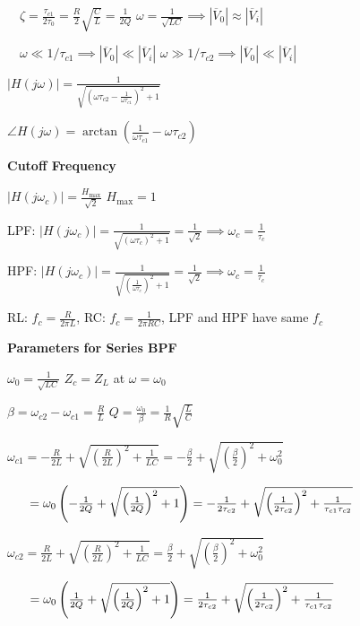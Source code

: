 \documentclass[twocolumn]{article}
\begin{document}
$\quad \zeta = \frac{\tau_{c1}}{2\tau_0} = \frac{R}{2} \sqrt{\frac{C}{L}} = \frac{1}{2Q}$ \hfill $\omega = \frac{1}{\sqrt{LC}} \implies |\overline{V}_0| \approx |\overline{V}_i |$

$\quad \omega \ll 1 / \tau_{c1} \implies |\overline{V}_0| \ll | \overline{V}_i |$ \hfill $\omega \gg 1 / \tau_{c2} \implies |\overline{V}_0| \ll | \overline{V}_i |$

$|H(j\omega)| = \frac{1}{\sqrt{\left( \omega \tau_{c2} - \frac{1}{\omega \tau_{c1}} \right)^2 + 1}}$

$\angle H(j\omega) = \arctan \left( \frac{1}{\omega \tau_{c1}} - \omega \tau_{c2} \right)$

\cleardoublepage


\textbf{Cutoff Frequency}

$|H(j\omega_c)| = \frac{H_{\text{max}}}{\sqrt{2}}$ \hfill $H_{\text{max}} = 1$

LPF: $|H(j \omega_c)| = \frac{1}{\sqrt{(\omega \tau_c)^2 + 1}} = \frac{1}{\sqrt{2}} \implies \omega_c = \frac{1}{\tau_c}$

HPF: $|H(j \omega_c)| = \frac{1}{\sqrt{\left( \frac{1}{\omega \tau_c} \right)^2 + 1}} = \frac{1}{\sqrt{2}} \implies \omega_c = \frac{1}{\tau_c}$

RL: $f_c = \frac{R}{2\pi L}$, \hfill RC: $f_c = \frac{1}{2\pi RC}$, \hfill LPF and HPF have same $f_c$

\dotfill

\textbf{Parameters for Series BPF}

$\omega_0 = \frac{1}{\sqrt{LC}}$ \hfill $Z_c = Z_L$ at $\omega = \omega_0$

$\beta = \omega_{c2} - \omega_{c1} = \frac{R}{L}$ \hfill $Q = \frac{\omega_0}{\beta} = \frac{1}{R} \sqrt{\frac{L}{C}}$


$\omega_{c1} = -\frac{R}{2L} + \sqrt{\left( \frac{R}{2L} \right)^2 + \frac{1}{LC}} = -\frac{\beta}{2} + \sqrt{\left(\frac{\beta}{2}\right)^2 + \omega_0^2}$

$\hspace{1.75em} = \omega_0 \left( -\frac{1}{2Q} + \sqrt{\left(\frac{1}{2Q}\right)^2 + 1} \right) = -\frac{1}{2\tau_{c2}} + \sqrt{\left(\frac{1}{2\tau_{c2}}\right)^2 + \frac{1}{\tau_{c1} \tau_{c2}}}$

$\omega_{c2} = \frac{R}{2L} + \sqrt{\left( \frac{R}{2L} \right)^2 + \frac{1}{LC}} = \frac{\beta}{2} + \sqrt{\left(\frac{\beta}{2}\right)^2 + \omega_0^2}$

$\hspace{1.75em} = \omega_0 \left( \frac{1}{2Q} + \sqrt{\left(\frac{1}{2Q}\right)^2 + 1} \right) = \frac{1}{2\tau_{c2}} + \sqrt{\left(\frac{1}{2\tau_{c2}}\right)^2 + \frac{1}{\tau_{c1} \tau_{c2}}}$
\end{document}
